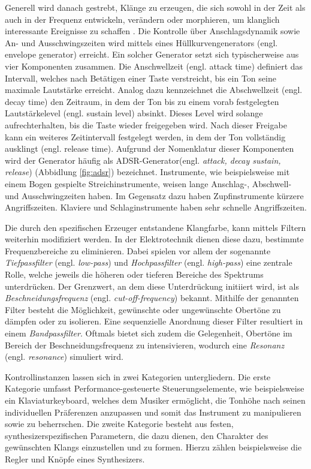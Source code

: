 \documentclass[
  a4paper,  %
  twoside,  %
  bibliography=totoc,
  headsepline,
  cleardoublepage=empty,
  parskip=half,
  draft=false
]{scrbook}
\begin{document}
Generell wird danach gestrebt, Klänge zu erzeugen, die sich sowohl in der Zeit als auch in der Frequenz entwickeln, verändern oder morphieren, um klanglich interessante Ereignisse zu schaffen \cite{pirkle_designing_2021}. Die Kontrolle über Anschlagsdynamik sowie An- und Ausschwingszeiten wird mittels eines Hüllkurvengenerators (engl. envelope generator) erreicht. Ein solcher Generator setzt sich typischerweise aus vier Komponenten zusammen. Die Anschwellzeit (engl. attack time) definiert das Intervall, welches nach Betätigen einer Taste verstreicht, bis ein Ton seine maximale Lautstärke erreicht. Analog dazu kennzeichnet die Abschwellzeit (engl. decay time) den Zeitraum, in dem der Ton bis zu einem vorab festgelegten Lautstärkelevel (engl. sustain level) absinkt. Dieses Level wird solange aufrechterhalten, bis die Taste wieder freigegeben wird. Nach dieser Freigabe kann ein weiteres Zeitintervall festgelegt werden, in dem der Ton vollständig ausklingt (engl. release time). Aufgrund der Nomenklatur dieser Komponenten wird der Generator häufig als ADSR-Generator(engl. \emph{attack, decay sustain, release}) (Abbidlung \ref{fig:adsr})  bezeichnet. Instrumente, wie beispielsweise mit einem Bogen gespielte Streichinstrumente, weisen lange Anschlag-, Abschwell- und Ausschwingzeiten haben. Im Gegensatz dazu haben Zupfinstrumente kürzere Angriffszeiten. Klaviere und Schlaginstrumente haben sehr schnelle Angriffszeiten. \cite{ruschkowski_elektronische_2019, russ_sound_2009}

Die durch den spezifischen Erzeuger entstandene Klangfarbe, kann mittels Filtern weiterhin modifiziert werden. In der Elektrotechnik dienen diese dazu, bestimmte Frequenzbereiche zu eliminieren. Dabei spielen vor allem der sogenannte \emph{Tiefpassfilter} (engl. \emph{low-pass}) und \emph{Hochpassfilter} (engl. \emph{high-pass}) eine zentrale Rolle, welche jeweils die höheren oder tieferen Bereiche des Spektrums unterdrücken. Der Grenzwert, an dem diese Unterdrückung initiiert wird, ist als \emph{Beschneidungsfrequenz} (engl. \emph{cut-off-frequency}) bekannt. Mithilfe der genannten Filter besteht die Möglichkeit, gewünschte oder ungewünschte Obertöne zu dämpfen oder zu isolieren. Eine sequenzielle Anordnung dieser Filter resultiert in einem \emph{Bandpassfilter}. Oftmals bietet sich zudem die Gelegenheit, Obertöne im Bereich der Beschneidungsfrequenz zu intensivieren, wodurch eine \emph{Resonanz} (engl. \emph{resonance}) simuliert wird. \cite{ruschkowski_elektronische_2019}

Kontrollinstanzen lassen sich in zwei Kategorien untergliedern. Die erste Kategorie umfasst Performance-gesteuerte Steuerungselemente, wie beispielsweise ein Klaviaturkeyboard, welches dem Musiker ermöglicht, die Tonhöhe nach seinen individuellen Präferenzen anzupassen und somit das Instrument zu manipulieren sowie zu beherrschen. Die zweite Kategorie besteht aus festen, synthesizerspezifischen Parametern, die dazu dienen, den Charakter des gewünschten Klangs einzustellen und zu formen. Hierzu zählen beispielsweise die Regler und Knöpfe eines Synthesizers. \cite{russ_sound_2009}
\end{document}
